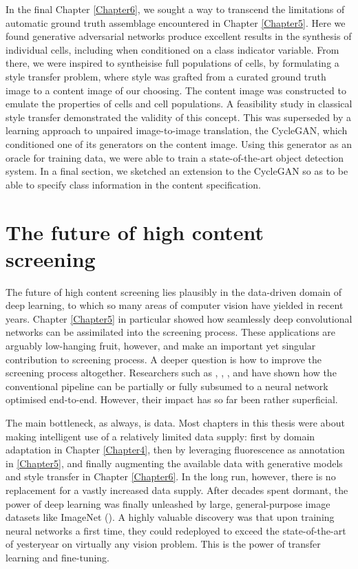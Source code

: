 In the final Chapter \ref{Chapter6}, we sought a way to transcend the limitations of automatic ground truth assemblage encountered in Chapter \ref{Chapter5}. Here we found generative adversarial networks produce excellent results in the synthesis of individual cells, including when conditioned on a class indicator variable. From there, we were inspired to syntheisise full populations of cells, by formulating a style transfer problem, where style was grafted from a curated ground truth image to a content image of our choosing. The content image was constructed to emulate the properties of cells and cell populations. A feasibility study in classical style transfer demonstrated the validity of this concept. This was superseded by a learning approach to unpaired image-to-image translation, the CycleGAN, which conditioned one of its generators on the content image. Using this generator as an oracle for training data, we were able to train a state-of-the-art object detection system. In a final section, we sketched an extension to the CycleGAN so as to be able to specify class information in the content specification.

\section{The future of high content screening}

The future of high content screening lies plausibly in the data-driven domain of deep learning, to which so many areas of computer vision have yielded in recent years. Chapter \ref{Chapter5} in particular showed how seamlessly deep convolutional networks can be assimilated into the screening process. These applications are arguably low-hanging fruit, however, and make an important yet singular contribution to screening process. A deeper question is how to improve the screening process altogether. Researchers such as \cite{kraus2016classifying}, \cite{kandaswamy2016high}, \cite{godinez2017multi}, and \cite{sommer2017deep} have shown how the conventional pipeline can be partially or fully subsumed to a neural network optimised end-to-end. However, their impact has so far been rather superficial.

The main bottleneck, as always, is data. Most chapters in this thesis were about making intelligent use of a relatively limited data supply: first by domain adaptation in Chapter \ref{Chapter4}, then by leveraging fluorescence as annotation in \ref{Chapter5}, and finally augmenting the available data with generative models and style transfer in Chapter \ref{Chapter6}. In the long run, however, there is no replacement for a vastly increased data supply. After decades spent dormant, the power of deep learning was finally unleashed by large, general-purpose image datasets like ImageNet (\cite{russakovsky2015imagenet}). A highly valuable discovery was that upon training neural networks a first time, they could redeployed to exceed the state-of-the-art of yesteryear on virtually any vision problem. This is the power of transfer learning and fine-tuning.

